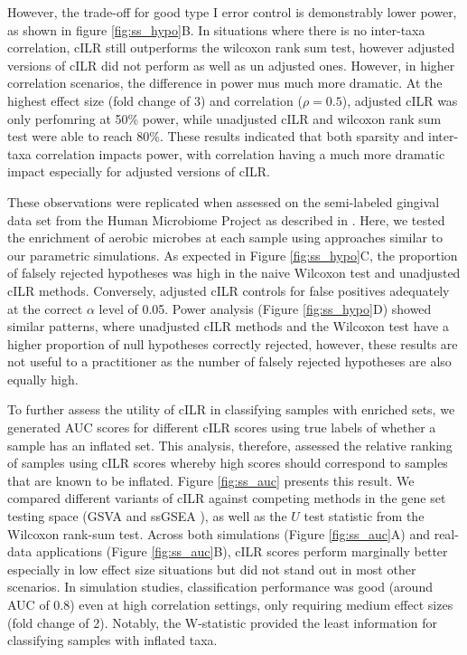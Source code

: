 \documentclass{article}
\begin{document}
However, the trade-off for good type I error control is demonstrably lower power, as shown in figure \ref{fig:ss_hypo}B. In situations where there is no inter-taxa correlation, cILR still outperforms the wilcoxon rank sum test, however adjusted versions of cILR did not perform as well as un adjusted ones. However, in higher correlation scenarios, the difference in power mus much more dramatic. At the highest effect size (fold change of 3) and correlation ($\rho = 0.5$), adjusted cILR was only perfomring at 50\% power, while unadjusted cILR and wilcoxon rank sum test were able to reach 80\%. These results indicated that both sparsity and inter-taxa correlation impacts power, with correlation having a much more dramatic impact especially for adjusted versions of cILR.   

These observations were replicated when assessed on the semi-labeled gingival data set from the Human Microbiome Project as described in . Here, we tested the enrichment of aerobic microbes at each sample using approaches similar to our parametric simulations. As expected in Figure \ref{fig:ss_hypo}C, the proportion of falsely rejected hypotheses was high in the naive Wilcoxon test and unadjusted cILR methods. Conversely, adjusted cILR controls for false positives adequately at the correct $\alpha$ level of 0.05. Power analysis (Figure \ref{fig:ss_hypo}D) showed similar patterns, where unadjusted cILR methods and the Wilcoxon test have a higher proportion of null hypotheses correctly rejected, however, these results are not useful to a practitioner as the number of falsely rejected hypotheses are also equally high.  

To further assess the utility of cILR in classifying samples with enriched sets, we generated AUC scores for different cILR scores using true labels of whether a sample has an inflated set. This analysis, therefore, assessed the relative ranking of samples using cILR scores whereby high scores should correspond to samples that are known to be inflated. Figure \ref{fig:ss_auc} presents this result. We compared different variants of cILR against competing methods in the gene set testing space (GSVA \cite{hanzelmann2013} and ssGSEA \cite{barbie2009}), as well as the $U$ test statistic from the Wilcoxon rank-sum test. Across both simulations (Figure \ref{fig:ss_auc}A) and real-data applications (Figure \ref{fig:ss_auc}B), cILR scores perform marginally better especially in low effect size situations but did not stand out in most other scenarios. In simulation studies, classification performance was good (around AUC of 0.8) even at high correlation settings, only requiring medium effect sizes (fold change of 2). Notably, the W-statistic provided the least information for classifying samples with inflated taxa.
\end{document}
